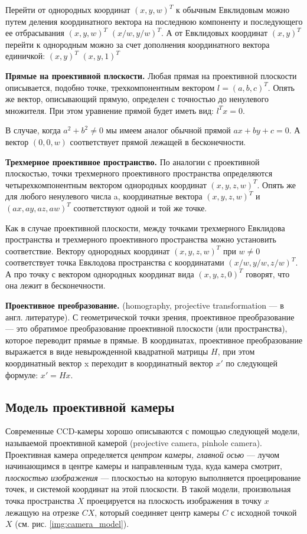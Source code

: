 Перейти от однородных координат $(x, y, w)^T$ к обычным Евклидовым можно путем деления координатного вектора на последнюю компоненту и последующего ее отбрасывания $(x,y,w)^T$ $(x/w,y/w)^T$. А от Евклидовых координат $(x,y)^T$ перейти к однородным можно за счет дополнения координатного вектора единичкой: $(x,y)^T$ $(x,y,1)^T$

\textbf{Прямые на проективной плоскости.} Любая прямая на проективной плоскости описывается, подобно точке, трехкомпонентным вектором $l = (a,b,c)^T$. Опять же вектор, описывающий прямую, определен с точностью до ненулевого множителя. При этом уравнение прямой будет иметь вид: $l^T x = 0$.

В случае, когда $a^2 + b^2 \neq 0$ мы имеем аналог обычной прямой $ax + by + c = 0$. А вектор $(0,0,w)$ соответствует прямой лежащей в бесконечности.

\textbf{Трехмерное проективное пространство.} По аналогии с проективной плоскостью, точки трехмерного проективного пространства определяются четырехкомпонентным вектором однородных координат $(x,y,z,w)^T$. Опять же для любого ненулевого числа a, координатные вектора $(x,y,z,w)^T$ и $(ax,ay,az,aw)^T$ соответствуют одной и той же точке.

Как в случае проективной плоскости, между точками трехмерного Евклидова пространства и трехмерного проективного пространства можно установить соответствие. Вектору однородных координат $(x,y,z,w)^T$ при $w \neq 0$ соответствует точка Евклодова пространства с координатами $(x/w,y/w,z/w)^T$. А про точку с вектором однородных координат вида $(x,y,z,0)^T$ говорят, что она лежит в бесконечности.

\textbf{Проективное преобразование.} (homography, projective transformation — в англ. литературе). С геометрической точки зрения, проективное преобразование — это обратимое преобразование проективной плоскости (или пространства), которое переводит прямые в прямые. В координатах, проективное преобразование выражается в виде невырожденной квадратной матрицы $H$, при этом координатный вектор x переходит в координатный вектор $x'$ по следующей формуле: $x' = H x$.

\subsection{Модель проективной камеры}
Современные CCD-камеры хорошо описываются с помощью следующей модели, называемой проективной камерой (projective camera, pinhole camera). Проективная камера определяется \textit{центром камеры, главной осью} — лучом начинающимся в центре камеры и направленным туда, куда камера смотрит, \textit{плоскостью изображения} — плоскостью на которую выполняется проецирование точек, и системой координат на этой плоскости. В такой модели, произвольная точка пространства $X$ проецируется на плоскость изображения в точку $x$ лежащую на отрезке $CX$, который соединяет центр камеры $C$ с исходной точкой $X$ (см. рис. \ref{img:camera_model}).


